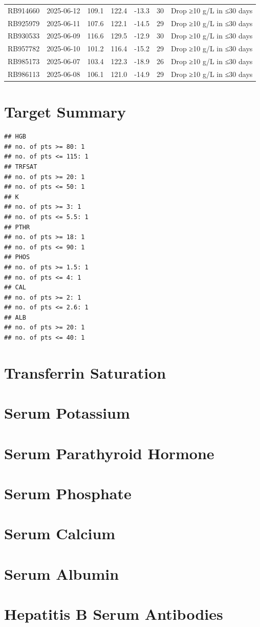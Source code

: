 \documentclass[
]{article}
\begin{document}
\begin{longtable}[t]{llrrrrl}
RB914660 & 2025-06-12 & 109.1 & 122.4 & -13.3 & 30 & Drop ≥10 g/L in ≤30 days\\
RB925979 & 2025-06-11 & 107.6 & 122.1 & -14.5 & 29 & Drop ≥10 g/L in ≤30 days\\
RB930533 & 2025-06-09 & 116.6 & 129.5 & -12.9 & 30 & Drop ≥10 g/L in ≤30 days\\
RB957782 & 2025-06-10 & 101.2 & 116.4 & -15.2 & 29 & Drop ≥10 g/L in ≤30 days\\
\addlinespace
RB985173 & 2025-06-07 & 103.4 & 122.3 & -18.9 & 26 & Drop ≥10 g/L in ≤30 days\\
RB986113 & 2025-06-08 & 106.1 & 121.0 & -14.9 & 29 & Drop ≥10 g/L in ≤30 days\\
\bottomrule
\end{longtable}

\section{Target Summary}\label{target-summary}

\begin{verbatim}
## HGB
## no. of pts >= 80: 1
## no. of pts <= 115: 1
## TRFSAT
## no. of pts >= 20: 1
## no. of pts <= 50: 1
## K
## no. of pts >= 3: 1
## no. of pts <= 5.5: 1
## PTHR
## no. of pts >= 18: 1
## no. of pts <= 90: 1
## PHOS
## no. of pts >= 1.5: 1
## no. of pts <= 4: 1
## CAL
## no. of pts >= 2: 1
## no. of pts <= 2.6: 1
## ALB
## no. of pts >= 20: 1
## no. of pts <= 40: 1
\end{verbatim}

\section{Transferrin Saturation}\label{transferrin-saturation}

\section{Serum Potassium}\label{serum-potassium}

\section{Serum Parathyroid Hormone}\label{serum-parathyroid-hormone}

\section{Serum Phosphate}\label{serum-phosphate}

\section{Serum Calcium}\label{serum-calcium}

\section{Serum Albumin}\label{serum-albumin}

\section{Hepatitis B Serum
Antibodies}\label{hepatitis-b-serum-antibodies}
\end{document}
